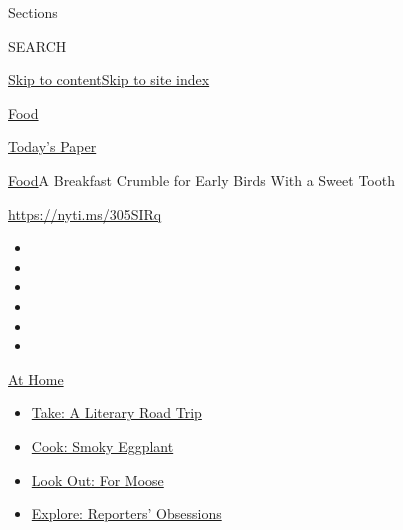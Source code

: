 Sections

SEARCH

\protect\hyperlink{site-content}{Skip to
content}\protect\hyperlink{site-index}{Skip to site index}

\href{https://www.nytimes3xbfgragh.onion/section/food}{Food}

\href{https://myaccount.nytimes3xbfgragh.onion/auth/login?response_type=cookie\&client_id=vi}{}

\href{https://www.nytimes3xbfgragh.onion/section/todayspaper}{Today's
Paper}

\href{/section/food}{Food}\textbar{}A Breakfast Crumble for Early Birds
With a Sweet Tooth

\url{https://nyti.ms/305SIRq}

\begin{itemize}
\item
\item
\item
\item
\item
\item
\end{itemize}

\href{https://www.nytimes3xbfgragh.onion/spotlight/at-home?action=click\&pgtype=Article\&state=default\&region=TOP_BANNER\&context=at_home_menu}{At
Home}

\begin{itemize}
\tightlist
\item
  \href{https://www.nytimes3xbfgragh.onion/2020/07/28/books/time-for-a-literary-road-trip.html?action=click\&pgtype=Article\&state=default\&region=TOP_BANNER\&context=at_home_menu}{Take:
  A Literary Road Trip}
\item
  \href{https://www.nytimes3xbfgragh.onion/2020/07/29/magazine/bored-with-your-home-cooking-some-smoky-eggplant-will-fix-that.html?action=click\&pgtype=Article\&state=default\&region=TOP_BANNER\&context=at_home_menu}{Cook:
  Smoky Eggplant}
\item
  \href{https://www.nytimes3xbfgragh.onion/2020/07/27/travel/moose-michigan-isle-royale.html?action=click\&pgtype=Article\&state=default\&region=TOP_BANNER\&context=at_home_menu}{Look
  Out: For Moose}
\item
  \href{https://www.nytimes3xbfgragh.onion/interactive/2020/at-home/even-more-reporters-editors-diaries-lists-recommendations.html?action=click\&pgtype=Article\&state=default\&region=TOP_BANNER\&context=at_home_menu}{Explore:
  Reporters' Obsessions}
\end{itemize}

